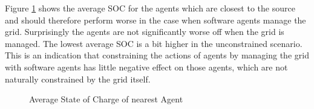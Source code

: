 \documentclass[a4paper]{article}
\begin{document}
Figure \ref{averages_unconstrained_near} shows the average SOC for the agents which are closest to the source and should therefore 
perform worse in the case when software agents manage the grid. Surprisingly the agents are not significantly worse off when the 
grid is managed. The lowest average SOC is a bit higher in the unconstrained scenario. 
This is an indication that constraining the actions of agents by managing the grid with software agents has little negative 
effect on those agents, which are not naturally constrained by the grid itself.\\
\begin{figure}[!ht]
\caption{Average State of Charge of nearest Agent}
\label{averages_unconstrained_near}
\end{figure}
\end{document}
